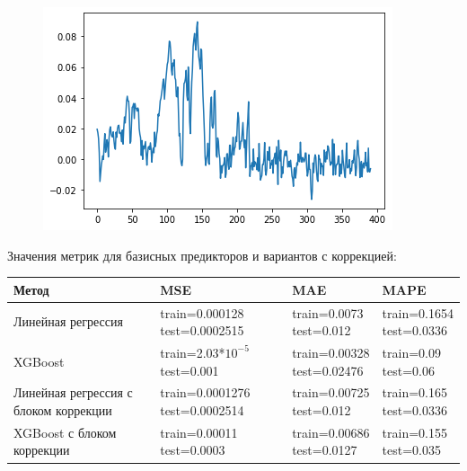 \documentclass[11pt]{article}
\begin{document}
\begin{figure}[H]
\centering
\includegraphics[scale=0.5]{dji_test_xgboost_with_correction_correction_outputs.png}
\label{}
\end{figure}

Значения метрик для базисных предикторов и вариантов с коррекцией:

\begin{tabular}{ |p{3cm}|p{3cm}|p{3cm}|p{3cm}|  }
 \hline
 Метод & MSE &  MAE & MAPE \\
  \hline
 Линейная регрессия &
 \makecell{train=0.000128 \\ test=0.0002515} &
 \makecell{train=0.0073 \\ test=0.012} &
 \makecell{train=0.1654 \\ test=0.0336} \\
 \hline
 XGBoost &
 \makecell{train=2.03*$10^{-5}$ \\ test=0.001} &
 \makecell{train=0.00328 \\ test=0.02476} &
 \makecell{train=0.09 \\ test=0.06} \\
 
 \hline
 Линейная регрессия с блоком коррекции &
 \makecell{train=0.0001276 \\ test=0.0002514} &
 \makecell{train=0.00725 \\ test=0.012} &
 \makecell{train=0.165 \\ test=0.0336} \\
 \hline
 XGBoost с блоком коррекции &
 \makecell{train=0.00011 \\ test=0.0003} &
 \makecell{train=0.00686 \\ test=0.0127} &
 \makecell{train=0.155 \\ test=0.035} \\
 \hline
\end{tabular}
\end{document}
